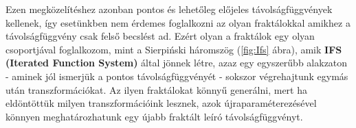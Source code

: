 Ezen megközelítéshez azonban pontos és lehetőleg előjeles távolságfüggvények kellenek, így esetünkben nem érdemes foglalkozni az olyan fraktálokkal amikhez a távolságfüggvény csak felső becslést ad. Ezért olyan a fraktálok egy olyan csoportjával foglalkozom, mint a Sierpiński háromszög (\ref{fig:Ifs} ábra), amik \textbf{IFS (Iterated Function System)}  által jönnek létre, azaz egy egyszerűbb alakzaton - aminek jól ismerjük a pontos távolságfüggvényét - sokszor végrehajtunk egymás után transzformációkat. Az ilyen fraktálokat könnyű generálni, mert ha eldöntöttük milyen transzformációink lesznek, azok újraparaméterezésével könnyen meghatározhatunk egy újabb fraktált leíró távolságfüggvényt.
